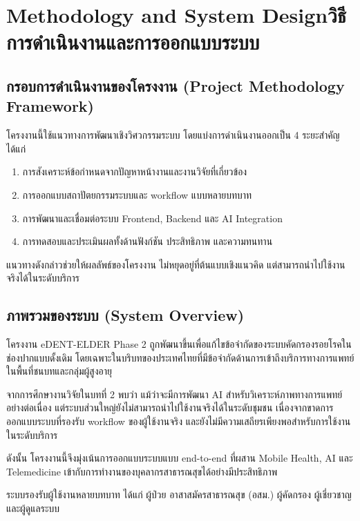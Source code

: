 \chapter{\ifenglish Methodology and System Design\else วิธีการดำเนินงานและการออกแบบระบบ\fi}

\section{กรอบการดำเนินงานของโครงงาน (Project Methodology Framework)}

โครงงานนี้ใช้แนวทางการพัฒนาเชิงวิศวกรรมระบบ
โดยแบ่งการดำเนินงานออกเป็น 4 ระยะสำคัญ ได้แก่

\begin{enumerate}
\item การสังเคราะห์ข้อกำหนดจากปัญหาหน้างานและงานวิจัยที่เกี่ยวข้อง
\item การออกแบบสถาปัตยกรรมระบบและ workflow แบบหลายบทบาท
\item การพัฒนาและเชื่อมต่อระบบ Frontend, Backend และ AI Integration
\item การทดสอบและประเมินผลทั้งด้านฟังก์ชัน ประสิทธิภาพ และความทนทาน
\end{enumerate}

แนวทางดังกล่าวช่วยให้ผลลัพธ์ของโครงงาน
ไม่หยุดอยู่ที่ต้นแบบเชิงแนวคิด แต่สามารถนำไปใช้งานจริงได้ในระดับบริการ

\section{ภาพรวมของระบบ (System Overview)}

โครงงาน eDENT-ELDER Phase 2 ถูกพัฒนาขึ้นเพื่อแก้ไขข้อจำกัดของระบบคัดกรองรอยโรคในช่องปากแบบดั้งเดิม
โดยเฉพาะในบริบทของประเทศไทยที่มีข้อจำกัดด้านการเข้าถึงบริการทางการแพทย์
ในพื้นที่ชนบทและกลุ่มผู้สูงอายุ

จากการศึกษางานวิจัยในบทที่ 2 พบว่า
แม้ว่าจะมีการพัฒนา AI สำหรับวิเคราะห์ภาพทางการแพทย์อย่างต่อเนื่อง
แต่ระบบส่วนใหญ่ยังไม่สามารถนำไปใช้งานจริงได้ในระดับชุมชน
เนื่องจากขาดการออกแบบระบบที่รองรับ workflow ของผู้ใช้งานจริง
และยังไม่มีความเสถียรเพียงพอสำหรับการใช้งานในระดับบริการ

ดังนั้น โครงงานนี้จึงมุ่งเน้นการออกแบบระบบแบบ end-to-end
ที่ผสาน Mobile Health, AI และ Telemedicine
เข้ากับการทำงานของบุคลากรสาธารณสุขได้อย่างมีประสิทธิภาพ

ระบบรองรับผู้ใช้งานหลายบทบาท ได้แก่
ผู้ป่วย อาสาสมัครสาธารณสุข (อสม.) ผู้คัดกรอง ผู้เชี่ยวชาญ และผู้ดูแลระบบ

